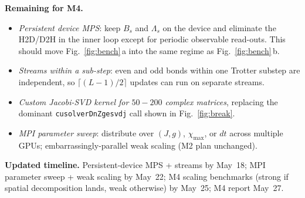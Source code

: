 \documentclass[11pt]{article}
\begin{document}
\textbf{Remaining for M4.}
\begin{itemize}
  \item \emph{Persistent device MPS}: keep $B_s$ and $\Lambda_s$ on the
  device and eliminate the H2D/D2H in the inner loop except for
  periodic observable read-outs. This should move
  Fig.~\ref{fig:bench}\,a into the same regime as
  Fig.~\ref{fig:bench}\,b.
  \item \emph{Streams within a sub-step}: even and odd bonds within one
  Trotter substep are independent, so $\lceil(L{-}1)/2\rceil$ updates
  can run on separate streams.
  \item \emph{Custom Jacobi-SVD kernel for $50{-}200$ complex matrices},
  replacing the dominant \texttt{cusolverDnZgesvdj} call shown in
  Fig.~\ref{fig:break}.
  \item \emph{MPI parameter sweep}: distribute over $(J, g)$,
  $\chi_\text{max}$, or $dt$ across multiple GPUs;
  embarrassingly-parallel weak scaling (M2 plan unchanged).
\end{itemize}

\textbf{Updated timeline.} Persistent-device MPS + streams by May~18;
MPI parameter sweep + weak scaling by May~22; M4 scaling benchmarks
(strong if spatial decomposition lands, weak otherwise) by May~25;
M4 report May~27.
\end{document}
